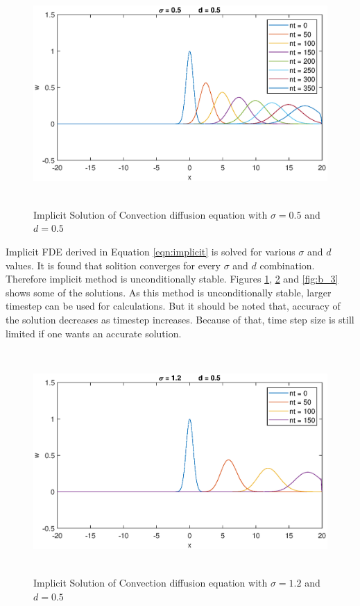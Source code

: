 \documentclass[letterpaper,12pt]{article}
\begin{document}
\begin{figure}[!ht] 
	\centering 
	\includegraphics[max height=8.5cm]{graphs/Bonus/sigma05d05.eps}
	\caption{Implicit Solution of Convection diffusion equation with $\sigma= 0.5$ and $d=0.5$}
	\label{fig:b_1}
\end{figure}

\vspace{1cm}

Implicit FDE derived in Equation \ref{eqn:implicit} is solved for various $\sigma$ and $d$ values. 
It is found that solition converges for every $\sigma$ and $d$ combination. Therefore implicit method 
is unconditionally stable. Figures \ref{fig:b_1}, \ref{fig:b_2} and \ref{fig:b_3} shows some of the solutions. 
As this method is unconditionally stable, larger timestep can be used for calculations. But it should be noted that, 
accuracy of the solution decreases as timestep increases. Because of that, time step size is still limited if one wants 
an accurate solution.

\newpage

\begin{figure}[!ht] 
	\centering 
	\includegraphics[max height=8.5cm]{graphs/Bonus/sigma12d05.eps}
	\caption{Implicit Solution of Convection diffusion equation with $\sigma= 1.2$ and $d=0.5$}
	\label{fig:b_2}
\end{figure}
\end{document}
